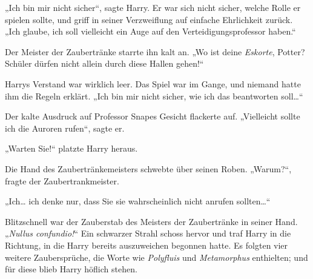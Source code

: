 „Ich bin mir nicht sicher“, sagte Harry.
Er war sich nicht sicher, welche Rolle er spielen sollte, und griff in seiner Verzweiflung auf einfache Ehrlichkeit zurück.
„Ich glaube, ich soll vielleicht ein Auge auf den Verteidigungsprofessor haben.“

Der Meister der Zaubertränke starrte ihn kalt an.
„Wo ist deine \emph{Eskorte}, Potter? Schüler dürfen nicht allein durch diese Hallen gehen!“

Harrys Verstand war wirklich leer. Das Spiel war im Gange, und niemand hatte ihm die Regeln erklärt. „Ich bin mir nicht sicher, wie ich das beantworten soll…“

Der kalte Ausdruck auf Professor Snapes Gesicht flackerte auf. „Vielleicht sollte ich die Auroren rufen“, sagte er.

„Warten Sie!“ platzte Harry heraus.

Die Hand des Zaubertränkemeisters schwebte über seinen Roben.
„Warum?“, fragte der Zaubertrankmeister.

„Ich… ich denke nur, dass Sie sie wahrscheinlich nicht anrufen sollten…“

Blitzschnell war der Zauberstab des Meisters der Zaubertränke in seiner Hand.
„\emph{Nullus confundio!}“
Ein schwarzer Strahl schoss hervor und traf Harry in die Richtung, in die Harry bereits auszuweichen begonnen hatte. Es folgten vier weitere Zaubersprüche, die Worte wie \emph{Polyfluis} und \emph{Metamorphus} enthielten; und für diese blieb Harry höflich stehen.

